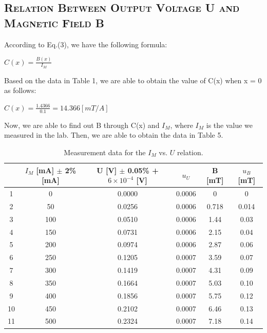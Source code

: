 \documentclass[a4paper,12pt]{article}
\begin{document}
\subsection{\textsc{Relation Between Output Voltage U and Magnetic Field B}}
According to Eq.(3), we have the following formula:
\begin{center}
$\displaystyle C(x) = \frac{B(x)}{I_M} $
\end{center}
Based on the data in Table 1, we are able to obtain the value of C(x) when x = 0 as follows:
\begin{center}
$\displaystyle C(x) = \frac{1.4366}{0.1} = 14.366 [mT/A] $
\end{center}
Now, we are able to find out B through C(x) and $I_M$, where $I_M$ is the value we measured in the lab. Then, we are able to obtain the data in Table 5.
\begin{table}[H]
\begin{center}
\begin{tabular}{|c|c|c|c|c|c|}
\hline
 & $I_M$ {[}mA{]} $\pm$ 2\% {[}mA{]} & U {[}V{]} $\pm$ 0.05\% + $6\times10^{-4}$ {[}V{]} & $u_U$ & B {[}mT{]} & $u_B$ {[}mT{]} \\ \hline
1 & 0 & 0.0000 & 0.0006 & 0 & 0 \\ \hline
2 & 50 & 0.0256 & 0.0006 & 0.718 & 0.014 \\ \hline
3 & 100 & 0.0510 & 0.0006 & 1.44 & 0.03 \\ \hline
4 & 150 & 0.0731 & 0.0006 & 2.15 & 0.04 \\ \hline
5 & 200 & 0.0974 & 0.0006 & 2.87 & 0.06 \\ \hline
6 & 250 & 0.1205 & 0.0007 & 3.59 & 0.07 \\ \hline
7 & 300 & 0.1419 & 0.0007 & 4.31 & 0.09 \\ \hline
8 & 350 & 0.1664 & 0.0007 & 5.03 & 0.10 \\ \hline
9 & 400 & 0.1856 & 0.0007 & 5.75 & 0.12 \\ \hline
10 & 450 & 0.2102 & 0.0007 & 6.46 & 0.13 \\ \hline
11 & 500 & 0.2324 & 0.0007 & 7.18 & 0.14 \\ \hline
\end{tabular}
\caption{Measurement data for the $I_M$ vs. $U$ relation.}
\end{center}
\end{table}
\end{document}
